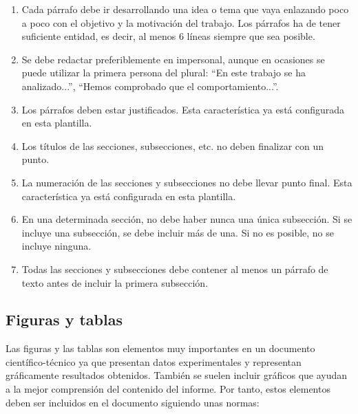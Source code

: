 \documentclass[11pt]{article}
\begin{document}
\begin{enumerate}

    \item Cada párrafo debe ir desarrollando una idea o tema que vaya enlazando poco a poco con el objetivo y la motivación del trabajo. Los párrafos ha de tener suficiente entidad, es decir, al menos 6 líneas siempre que sea posible.
    
    \item Se debe redactar preferiblemente en impersonal, aunque en ocasiones se puede utilizar la primera persona del plural: ``En este trabajo se ha analizado...'', ``Hemos comprobado que el comportamiento...''.

    \item Los párrafos deben estar justificados. Esta característica ya está configurada en esta plantilla.

    \item Los títulos de las secciones, subsecciones, etc. no deben finalizar con un punto. 

    \item La numeración de las secciones y subsecciones no debe llevar punto final. Esta característica ya está configurada en esta plantilla.

    \item En una determinada sección, no debe haber nunca una única subsección. Si se incluye una subsección, se debe incluir más de una. Si no es posible, no se incluye ninguna.

    \item Todas las secciones y subsecciones debe contener al menos un párrafo de texto antes de incluir la primera subsección.

\end{enumerate}


\subsection{Figuras y tablas}

Las figuras y las tablas son elementos muy importantes en un documento científico-técnico ya que presentan datos experimentales y representan gráficamente resultados obtenidos. También se suelen incluir gráficos que ayudan a la mejor comprensión del contenido del informe. Por tanto, estos elementos deben ser incluidos en el documento siguiendo unas normas:
\end{document}
